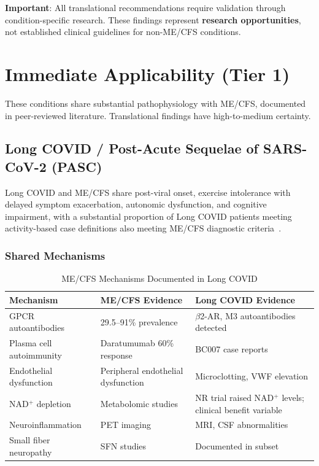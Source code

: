 \textbf{Important}: All translational recommendations require validation through condition-specific research. These findings represent \textbf{research opportunities}, not established clinical guidelines for non-ME/CFS conditions.

\section{Immediate Applicability (Tier 1)}
\label{sec:tier1-conditions}

These conditions share substantial pathophysiology with ME/CFS, documented in peer-reviewed literature. Translational findings have high-to-medium certainty.

\subsection{Long COVID / Post-Acute Sequelae of SARS-CoV-2 (PASC)}
\label{sec:longcovid}

Long COVID and ME/CFS share post-viral onset, exercise intolerance with delayed symptom exacerbation, autonomic dysfunction, and cognitive impairment, with a substantial proportion of Long COVID patients meeting activity-based case definitions also meeting ME/CFS diagnostic criteria~\cite{Jason2023LongCOVID}.

\subsubsection{Shared Mechanisms}

\begin{table}[h]
\centering
\caption{ME/CFS Mechanisms Documented in Long COVID}
\label{tab:longcovid-mechanisms}
\begin{tabular}{lll}
\toprule
\textbf{Mechanism} & \textbf{ME/CFS Evidence} & \textbf{Long COVID Evidence} \\
\midrule
GPCR autoantibodies & 29.5--91\% prevalence~\cite{Loebel2016,Bynke2020} & $\beta$2-AR, M3 autoantibodies detected \\
Plasma cell autoimmunity & Daratumumab 60\% response~\cite{Fluge2025daratumumab} & BC007 case reports \\
Endothelial dysfunction & Peripheral endothelial dysfunction~\cite{Scherbakov2020} & Microclotting, VWF elevation \\
NAD$^+$ depletion & Metabolomic studies~\cite{heng2025mecfs} & NR trial raised NAD$^+$ levels; clinical benefit variable~\cite{Wu2025NRLongCOVID} \\
Neuroinflammation & PET imaging~\cite{Nakatomi2014neuroinflammation} & MRI, CSF abnormalities \\
Small fiber neuropathy & SFN studies~\cite{Azcue2023sfn} & Documented in subset \\
\bottomrule
\end{tabular}
\end{table}

